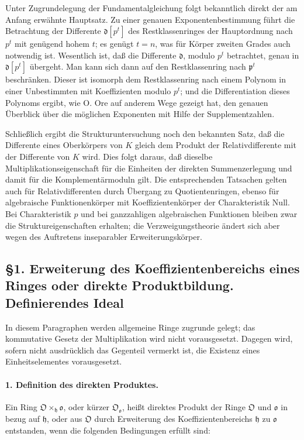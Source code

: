 \documentclass[11pt]{article}
\begin{document}
Unter Zugrundelegung der Fundamentalgleichung folgt bekanntlich direkt der am Anfang erwähnte Hauptsatz. Zu einer genauen Exponentenbestimmung führt die Betrachtung der Differente $\mathfrak d[p^t]$ des Restklassenringes der Hauptordnung nach $p^t$ mit genügend hohem $t$; es genügt $t=n$, was für Körper zweiten Grades auch notwendig ist. Wesentlich ist, daß die Differente $\mathfrak d$, modulo $p^t$ betrachtet, genau in $\mathfrak d[p^t]$ übergeht. Man kann sich dann auf den Restklassenring nach $\mathfrak p^t$ beschränken. Dieser ist isomorph dem Restklassenring nach einem Polynom in einer Unbestimmten mit Koeffizienten modulo $p^t$; und die Differentiation dieses Polynoms ergibt, wie O. Ore auf anderem Wege gezeigt hat, den genauen Überblick über die möglichen Exponenten mit Hilfe der Supplementzahlen.

Schließlich ergibt die Strukturuntersuchung noch den bekannten Satz, daß die Differente eines Oberkörpers von $K$ gleich dem Produkt der Relativdifferente mit der Differente von $K$ wird. Dies folgt daraus, daß dieselbe Multiplikationseigenschaft für die Einheiten der direkten Summenzerlegung und damit für die Komplementärmoduln gilt. Die entsprechenden Tatsachen gelten auch für Relativdifferenten durch Übergang zu Quotientenringen, ebenso für algebraische Funktionenkörper mit Koeffizientenkörper der Charakteristik Null. Bei Charakteristik $p$ und bei ganzzahligen algebraischen Funktionen bleiben zwar die Struktureigenschaften erhalten; die Verzweigungstheorie ändert sich aber wegen des Auftretens inseparabler Erweiterungskörper.

\subsection*{§1. Erweiterung des Koeffizientenbereichs eines Ringes oder direkte Produktbildung. Definierendes Ideal}

In diesem Paragraphen werden allgemeine Ringe zugrunde gelegt; das kommutative Gesetz der Multiplikation wird nicht vorausgesetzt. Dagegen wird, sofern nicht ausdrücklich das Gegenteil vermerkt ist, die Existenz eines Einheitselementes vorausgesetzt.

\paragraph{1. Definition des direkten Produktes.}
Ein Ring $\mathfrak O\times_{\mathfrak h}\mathfrak o$, oder kürzer $\mathfrak O_{\mathfrak o}$, heißt direktes Produkt der Ringe $\mathfrak O$ und $\mathfrak o$ in bezug auf $\mathfrak h$, oder aus $\mathfrak O$ durch Erweiterung des Koeffizientenbereichs $\mathfrak h$ zu $\mathfrak o$ entstanden, wenn die folgenden Bedingungen erfüllt sind:
\end{document}
